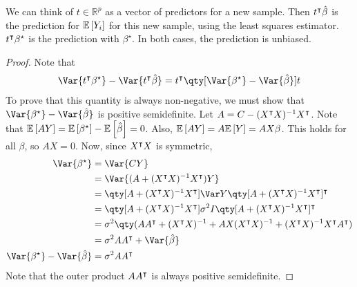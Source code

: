 \begin{remark}
	We can think of $t \in \mathbb R^p$ as a vector of predictors for a new sample.
	Then $t^\intercal \hat \beta$ is the prediction for $\mathbb{E}\left[{Y_i}\right]$ for this new sample, using the least squares estimator.
	$t^\intercal \beta^\star$ is the prediction with $\beta^\star$.
	In both cases, the prediction is unbiased.
\end{remark}
\begin{proof}
	Note that
	\begin{align*}
		\Var{t^\tran \beta^\star} - \Var{t^\tran \hat \beta} = t^\tran \qty[\Var{\beta^\star} - \Var{\hat\beta}] t
	\end{align*}
	To prove that this quantity is always non-negative, we must show that $\Var{\beta^\star} - \Var{\hat\beta}$ is positive semidefinite.
	Let $A = C - (X^\intercal X)^{-1} X^\intercal$.
	Note that $\mathbb{E}\left[{AY}\right] = \mathbb{E}\left[{\beta^\star}\right] - \mathbb{E}\left[{\hat\beta}\right] = 0$.
	Also, $\mathbb{E}\left[{AY}\right] = A \mathbb{E}\left[{Y}\right] = AX\beta$.
	This holds for all $\beta$, so $AX = 0$.
	Now, since $X^\intercal X$ is symmetric,
	\begin{align*}
		\Var{\beta^\star}                   & = \Var{CY}                                                                                                                          \\
		                                    & = \Var{(A+(X^\tran X)^{-1} X^\tran)Y}                                                                                     \\
		                                    & = \qty[A+(X^\tran X)^{-1} X^\tran] \Var Y \qty[A+(X^\tran X)^{-1} X^\tran]^\tran                           \\
		                                    & = \qty[A+(X^\tran X)^{-1} X^\tran] \sigma^2 I \qty[A+(X^\tran X)^{-1} X^\tran]^\tran                       \\
		                                    & = \sigma^2 \qty(A A^\tran + (X^\tran X)^{-1} + AX(X^\tran X)^{-1} + (X^\tran X)^{-1} X^\tran A^\tran) \\
		                                    & = \sigma^2 AA^\tran + \Var{\hat \beta}                                                                                         \\
		\Var{\beta^\star} - \Var{\hat\beta} & = \sigma^2 AA^\tran
	\end{align*}
	Note that the outer product $A A^\intercal$ is always positive semidefinite.
\end{proof}

